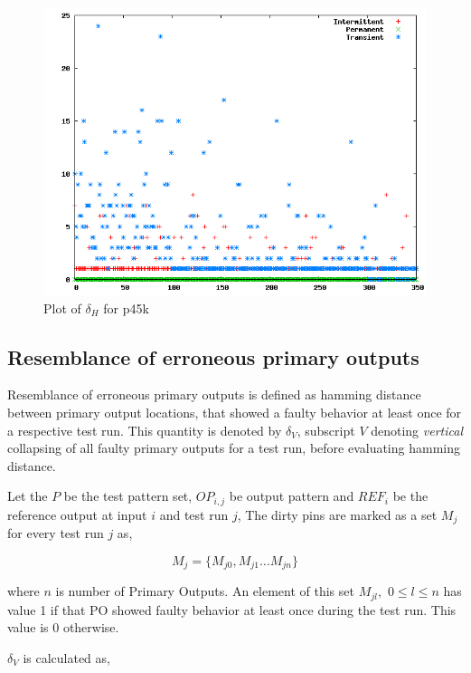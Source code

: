 \begin{figure}[h]
  \begin{center}
    \captionsetup{justification=centering}
    \includegraphics[scale=0.35]{figures/deltahp45k.png}
    \caption{Plot of $\delta_H$ for p45k}
    \label{fig:deltahp45k}
  \end{center}
\end{figure}

\subsection{Resemblance of erroneous primary outputs}
Resemblance of erroneous primary outputs is defined as hamming distance between primary output locations, that showed a faulty behavior at least once for a respective test run. This quantity is denoted by $\delta_V$, subscript $V$ denoting \emph{vertical} collapsing of all faulty primary outputs for a test run, before evaluating hamming distance.

Let the $P$ be the test pattern set, $OP_{i,j}$ be output pattern and $REF_i$ be the reference output at input $i$ and test run $j$, The dirty pins are marked as a set $M_j$ for every test run $j$ as,

\[M_j = \{M_{j0}, M_{j1} \ldots M_{jn}\}\]

where $n$ is number of Primary Outputs. An element of this set $M_{jl},$ $0\leq l \leq n$ has value 1 if that PO showed faulty behavior at least once during the test run. This value is 0 otherwise.

$\delta_V$ is calculated as,

